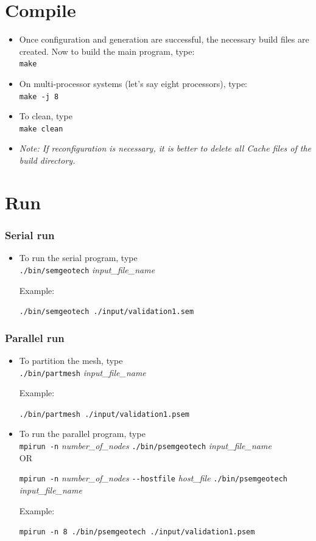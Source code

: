 \section{Compile}
\begin{itemize}[]
  \item Once configuration and generation are successful, the necessary build files are created. Now to build the main program, type: \\
  \texttt{make}

  \item On multi-processor systems (let's say eight processors), type:\\
  \texttt{make -j 8}

  \item To clean, type\\
  \texttt{make clean}
  \item{\emph{Note: If reconfiguration is necessary, it is better to delete all Cache files of the build directory.}}
\end{itemize}

\section{Run}
\subsubsection{Serial run}
\begin{itemize}[-]
\item To run the serial program, type \\
    \texttt{./bin/semgeotech} \emph{input\_file\_name}

    Example:

    \texttt{./bin/semgeotech ./input/validation1.sem}

\end{itemize}

\subsubsection{Parallel run}
\begin{itemize}[-]
\item To partition the mesh, type \\
    \texttt{./bin/partmesh} \emph{input\_file\_name}

    Example:

    \texttt{./bin/partmesh ./input/validation1.psem}

\item To run the parallel program, type \\
    \texttt{mpirun -n} \emph{number\_of\_nodes} \texttt{./bin/psemgeotech} \emph{input\_file\_name} \\

    OR

    \texttt{mpirun -n} \emph{number\_of\_nodes} \texttt{-{}-hostfile} \emph{host\_file} \texttt{./bin/psemgeotech} \emph{input\_file\_name}

    Example:

    \texttt{mpirun -n 8 ./bin/psemgeotech ./input/validation1.psem}
\end{itemize}

